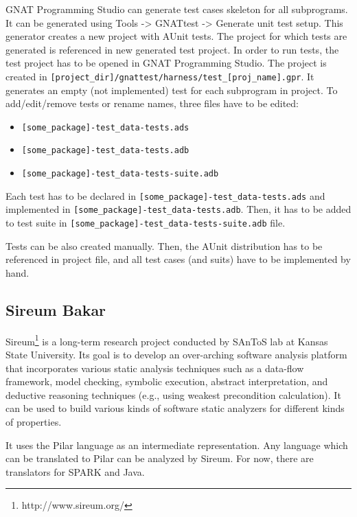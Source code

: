 GNAT Programming Studio can generate test cases skeleton for all subprograms. It can be generated using Tools -> GNATtest -> Generate unit test setup. This generator creates a new project with AUnit tests. The project for which tests are generated is referenced in new generated test project. In order to run tests, the test project has to be opened in GNAT Programming Studio. The project is created in \lstinline{[project_dir]/gnattest/harness/test_[proj_name].gpr}. It generates an empty (not implemented) test for each subprogram in project. To add/edit/remove tests or rename names, three files have to be edited:

\begin{itemize}
    \item \lstinline{[some_package]-test_data-tests.ads}
    \item \lstinline{[some_package]-test_data-tests.adb}
    \item \lstinline{[some_package]-test_data-tests-suite.adb}
\end{itemize}

Each test has to be declared in \lstinline{[some_package]-test_data-tests.ads} and implemented in \lstinline{[some_package]-test_data-tests.adb}. Then, it has to be added to test suite in \lstinline{[some_package]-test_data-tests-suite.adb} file.

Tests can be also created manually. Then, the AUnit distribution has to be referenced in project file, and all test cases (and suits) have to be implemented by hand.



\subsection{Sireum Bakar}
\label{background:sparkverification:sireum}

Sireum\footnote{http://www.sireum.org/} is a long-term research project conducted by SAnToS lab at Kansas State University. Its goal is to develop an over-arching software analysis platform that incorporates various static analysis techniques such as a data-flow framework, model checking, symbolic execution, abstract interpretation, and deductive reasoning techniques (e.g., using weakest precondition calculation). It can be used to build various kinds of software static analyzers for different kinds of properties. 

It uses the Pilar language \cite{Pilar:Paper} as an intermediate representation. Any language which can be translated to Pilar can be analyzed by Sireum. For now, there are translators for SPARK and Java.

